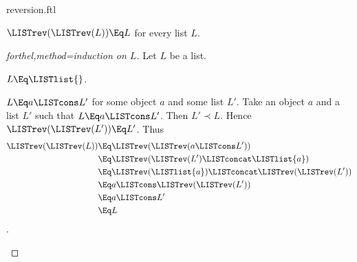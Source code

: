 \documentclass{stex}
\begin{document}
\begin{smodule}{reversion.ftl}
\begin{proposition}[forthel]
  $\LISTrev(\LISTrev(L)) \Eq L$ for every list $L$.
\end{proposition}
\begin{proof}[forthel,method=induction on $L$]
  Let $L$ be a list.

  \begin{case}{$L \Eq \LISTlist{}$.}\end{case}

  \begin{case}{$L \Eq a \LISTcons L'$ for some object $a$ and some list $L'$.}
    Take an object $a$ and a list $L'$ such that $L \Eq a \LISTcons L'$.
    Then $L' \prec L$.
    Hence $\LISTrev(\LISTrev(L')) \Eq L'$.
    Thus
    \begin{align*}
      \LISTrev(\LISTrev(L))
        &\Eq \LISTrev(\LISTrev(a \LISTcons L'))\\
        &\Eq \LISTrev(\LISTrev(L') \LISTconcat \LISTlist{a})\\
        &\Eq \LISTrev(\LISTlist{a}) \LISTconcat \LISTrev(\LISTrev(L'))\\
        &\Eq a \LISTcons \LISTrev(\LISTrev(L'))\\
        &\Eq a \LISTcons L'\\
        &\Eq L
    \end{align*}.
  \end{case}
\end{proof}
\end{smodule}
\end{document}
